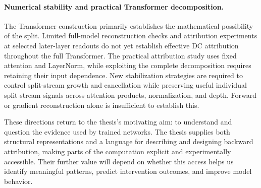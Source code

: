 \paragraph{Numerical stability and practical Transformer decomposition.}
The Transformer construction primarily establishes the mathematical possibility of the split. Limited full-model reconstruction checks and attribution experiments at selected later-layer readouts do not yet establish effective DC attribution throughout the full Transformer. The practical attribution study uses fixed attention and LayerNorm, while exploiting the complete decomposition requires retaining their input dependence. New stabilization strategies are required to control split-stream growth and cancellation while preserving useful individual split-stream signals across attention products, normalization, and depth. Forward or gradient reconstruction alone is insufficient to establish this.

These directions return to the thesis's motivating aim: to understand and question the evidence used by trained networks. The thesis supplies both structural representations and a language for describing and designing backward attribution, making parts of the computation explicit and experimentally accessible. Their further value will depend on whether this access helps us identify meaningful patterns, predict intervention outcomes, and improve model behavior.